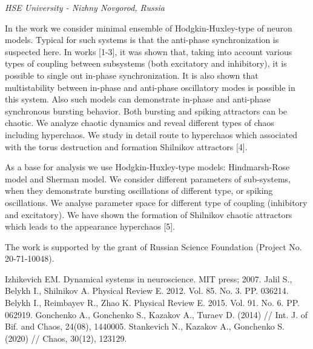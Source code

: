 
	
\begin{center}
	\maketitle
	{\large\textit{HSE University - Nizhny Novgorod, Russia}}
\end{center}

In the work we consider minimal ensemble of Hodgkin-Huxley-type of neuron models. Typical for such systems is that the anti-phase synchronization is suspected here. In works [1-3], it was shown that, taking into account various types of coupling between subsystems (both excitatory and inhibitory), it is possible to single out in-phase synchronization. It is also shown that multistability between in-phase and anti-phase oscillatory modes is possible in this system. Also such models can demonstrate in-phase and anti-phase synchronous bursting behavior. Both bursting and spiking attractors can be chaotic. We analyze chaotic dynamics and reveal different types of chaos including hyperchaos. We study in detail route to hyperchaos which associated with the torus destruction and formation Shilnikov attractors [4]. 

As a base for analysis we use Hodgkin-Huxley-type models: Hindmarsh-Rose model and Sherman model. We consider different parameters of sub-systems, when they demonstrate bursting oscillations of different type, or spiking oscillations. We analyse parameter space for different type of coupling (inhibitory and excitatory). We have shown the formation of Shilnikov chaotic attractors which leads to the appearance hyperchaos [5].

The work is supported by the grant of Russian Science Foundation (Project No. 20-71-10048).

\begin{thebibliography}{99}
     Izhikevich EM. Dynamical systems in neuroscience. MIT press; 2007.
     Jalil S., Belykh I., Shilnikov A. Physical Review E. 2012. Vol. 85. No. 3. PP. 036214.
	 Belykh I., Reimbayev R., Zhao K. Physical Review E. 2015. Vol. 91. No. 6. PP. 062919.
	 Gonchenko A., Gonchenko S., Kazakov A., Turaev D. (2014) // Int. J. of Bif. and Chaos, 24(08), 1440005.
	 Stankevich N., Kazakov A., Gonchenko S. (2020) // Chaos, 30(12), 123129.
	
\end{thebibliography}

